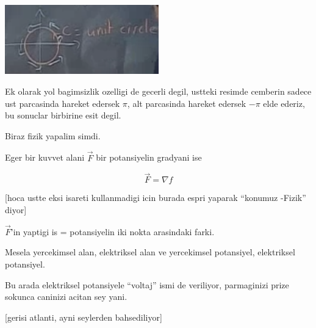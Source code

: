 \documentclass[12pt,fleqn]{article}\usepackage{../common}
\begin{document}
\includegraphics[height=3cm]{20_9.png}

Ek olarak yol bagimsizlik ozelligi de gecerli degil, ustteki resimde
cemberin sadece ust parcasinda hareket edersek $\pi$, alt parcasinda
hareket edersek $-\pi$ elde ederiz, bu sonuclar birbirine esit degil. 

Biraz fizik yapalim simdi.

Eger bir kuvvet alani $\vec{F}$ bir potansiyelin gradyani ise 

\[ \vec{F} = \nabla f \]

[hoca ustte eksi isareti kullanmadigi icin burada espri yaparak ``konumuz
-Fizik'' diyor]

$\vec{F}$'in yaptigi is = potansiyelin iki nokta arasindaki farki. 

Mesela yercekimsel alan, elektriksel alan ve yercekimsel potansiyel,
elektriksel potansiyel. 

Bu arada elektriksel potansiyele ``voltaj'' ismi de veriliyor, parmaginizi
prize sokunca caninizi acitan sey yani. 

[gerisi atlanti, ayni seylerden bahsediliyor]
\end{document}
